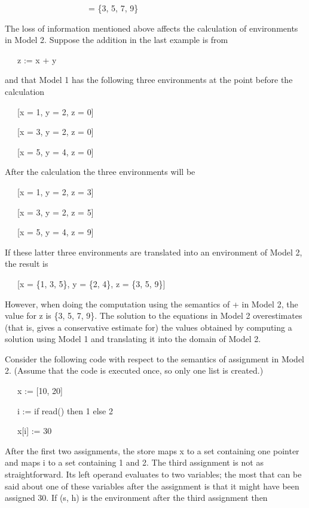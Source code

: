 {\ttfamily\mdseries
\ \ \ \ \ \ \ \ \ \ \ \ \ \ \ \ \ \ \ \ = \{3, 5, 7, 9\}}

The loss of information mentioned above affects the calculation of
environments in Model 2. Suppose the addition in the last example is
from

{\ttfamily\mdseries
\ \ \ z := x + y}

\noindent and that Model 1 has the following three environments at the
point before the calculation

{\ttfamily\mdseries
\ \ \ [x = 1, y = 2, z = 0]}

{\ttfamily\mdseries
\ \ \ [x = 3, y = 2, z = 0]}

{\ttfamily\mdseries
\ \ \ [x = 5, y = 4, z = 0]}

After the calculation the three environments will be 

{\ttfamily\mdseries
\ \ \ [x = 1, y = 2, z = 3]}

{\ttfamily\mdseries
\ \ \ [x = 3, y = 2, z = 5]}

{\ttfamily\mdseries
\ \ \ [x = 5, y = 4, z = 9]}

If these latter three environments are translated into an environment
of Model 2, the result is

{\ttfamily\mdseries
\ \ \ [x = \{1, 3, 5\}, y = \{2, 4\}, z = \{3, 5, 9\}]}

However, when doing the computation using the semantics of + in Model
2, the value for z is \{3, 5, 7, 9\}. The solution to the equations in
Model 2 overestimates (that is, gives a conservative estimate for) the
values obtained by computing a solution using Model 1 and translating
it into the domain of Model 2.

Consider the following code with respect to the semantics of
assignment in Model 2. (Assume that the code is executed once, so only
one list is created.)

{\ttfamily\mdseries
\ \ \ x := [10, 20]}

{\ttfamily\mdseries
\ \ \ i := if read() then 1 else 2}

{\ttfamily\mdseries
\ \ \ x[i] := 30}

After the first two assignments, the store maps x to a set containing
one pointer and maps i to a set containing 1 and 2. The third
assignment is not as straightforward. Its left operand evaluates to
two variables; the most that can be said about one of these variables
after the assignment is that it might have been assigned 30. If (s, h)
is the environment after the third assignment then

